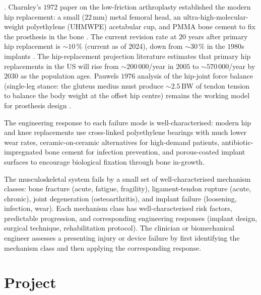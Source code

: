 . Charnley's $1972$ paper
on the low-friction arthroplasty established the modern hip
replacement: a small ($22\,\text{mm}$) metal femoral head, an
ultra-high-molecular-weight polyethylene (UHMWPE) acetabular cup,
and PMMA bone cement to fix the prosthesis in the bone
\cite[p.~64]{paper:v6c06-charnley-1972}. The current revision rate
at $20$ years after primary hip replacement is $\sim 10\,\%$
(current as of 2024), down from $\sim 30\,\%$ in the $1980$s
implants \cite[ch.~14]{text:mow-huiskes-orthopaedic}. The
hip-replacement projection literature
\cite[Tab.~1]{paper:v6c06-kurtz-2007} estimates that primary hip
replacements in the US will rise from $\sim 200\,000$/year in $2005$
to $\sim 570\,000$/year by $2030$ as the population ages. Pauwels
$1976$ analysis of the hip-joint force balance (single-leg stance:
the gluteus medius must produce $\sim 2.5\,\text{BW}$ of tendon
tension to balance the body weight at the offset hip centre)
remains the working model for prosthesis design
\cite[ch.~3]{paper:v6c06-pauwels-1976}.

The engineering response to each failure mode is well-characterised:
modern hip and knee replacements use cross-linked polyethylene
bearings with much lower wear rates, ceramic-on-ceramic alternatives
for high-demand patients, antibiotic-impregnated bone cement for
infection prevention, and porous-coated implant surfaces to encourage
biological fixation through bone in-growth.

\begin{principle}
The musculoskeletal system fails by a small set of well-characterised
mechanism classes: bone fracture (acute, fatigue, fragility),
ligament-tendon rupture (acute, chronic), joint degeneration
(osteoarthritis), and implant failure (loosening, infection,
wear). Each mechanism class has well-characterised risk factors,
predictable progression, and corresponding engineering responses
(implant design, surgical technique, rehabilitation protocol). The
clinician or biomechanical engineer assesses a presenting injury or
device failure by first identifying the mechanism class and then
applying the corresponding response.
\end{principle}

\section{Project}

